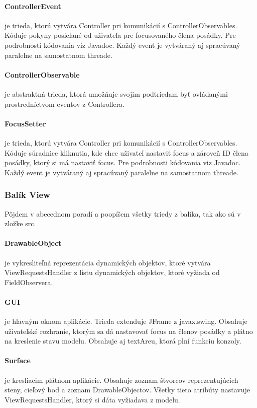 \documentclass[12pt,oneside,slovak,a4paper]{article}
\begin{document}
\paragraph{ControllerEvent} je trieda, ktorú vytvára Controller pri komunikácií s ControllerObservables. Kóduje pokyny posielané od uživateľa pre focusovaného člena posádky.  Pre podrobnosti kódovania viz Javadoc. Každý event je vytváraný aj spracúvaný paralelne na samostatnom threade.
\paragraph{ControllerObservable} je abstraktná trieda, ktorá umožňuje svojim podtriedam byť ovládanými prostredníctvom eventov z Controllera.
\paragraph{FocusSetter} je trieda, ktorú vytvára Controller pri komunikácií s ControllerObservables. Kóduje súradnice kliknutia, kde chce uživateľ nastaviť focus a zároveň ID člena posádky, ktorý si má nastaviť focus. Pre podrobnosti kódovania viz Javadoc. Každý event je vytváraný aj spracúvaný paralelne na samostatnom threade.
\subsubsection{Balík View}
Pôjdem v abecednom poradí a poopíšem všetky triedy z balíka, tak ako sú v zložke src.
\paragraph{DrawableObject} je vykresliteľná reprezentácia dynamických objektov, ktoré vytvára ViewRequestsHandler z listu dynamických objektov, ktoré vyžiada od FieldObservera.
\paragraph{GUI} je hlavným oknom aplikácie. Trieda extenduje JFrame z javax.swing. Obsahuje uživateľské rozhranie, ktorým sa dá nastavovať focus na členov posádky a plátno na kreslenie stavu modelu. Obsahuje aj textAreu, ktorá plní funkciu konzoly.
\paragraph{Surface} je kresliacim plátnom aplikácie. Obsahuje zoznam štvorcov reprezentujúcich steny, cieľový bod a zoznam DrawableObjectov. Všetky tieto atribúty nastavuje ViewRequestsHandler, ktorý si dáta vyžiadava z modelu.
\end{document}
